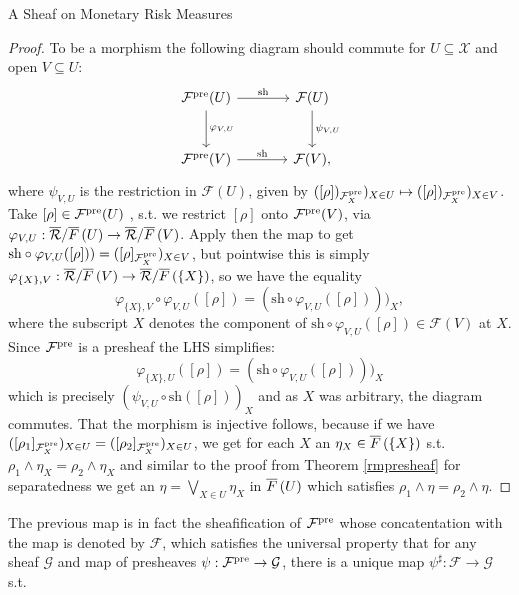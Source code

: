 \begin{subsection}{A Sheaf on Monetary Risk Measures}
\begin{proof}
        To be a morphism the following diagram should commute for \( U \subseteq \mathcal{X} \) and open \( V \subseteq U \):
        \[
        \begin{tikzcd}[row sep=large, column sep=large]
            \presh(U) \arrow[r, "\text{sh}"] \arrow[d, "\varphi_{V,U}"]& \mathcal{F}(U) \arrow[d, "\psi_{V,U}"] \\
            \presh(V) \arrow[r, "\text{sh}"] & \mathcal{F}(V),
        \end{tikzcd}
        \]
        where \( \psi_{V,U} \) is the restriction in \( \mathcal{F}(U) \), given by \( ([\rho])_{\mathcal{F}^{\text{pre}}_X})_{X \in U} \mapsto ([\rho])_{\mathcal{F}^{\text{pre}}_X})_{X \in V} \).
        Take \( [\rho] \in \mathcal{F}^{\text{pre}}(U) \) , s.t. we restrict
        \( [\rho] \) onto \( \mathcal{F}^{\text{pre}}(V) \), via \( \varphi_{V,U} : \overline{\mathcal{R}} / \overline{F}\left (U \right) \to \overline{\mathcal{R}} / \overline{F}\left (V \right) \).
        Apply then the map to get \( \text{sh} \circ \varphi_{V,U}([\rho])) = ([\rho]_{\mathcal{F}^{\text{pre}}_X})_{X \in V} \),
        but pointwise this is simply \( \varphi_{\{X\},V} : \overline{\mathcal{R}} / \overline{F}\left (V \right) \to \overline{\mathcal{R}} / \overline{F}\left (\{ X \}  \right) \),
        so we have the equality 
        \[
            \varphi_{\{X\},V} \circ \varphi_{V,U}([\rho]) = (\text{sh} \circ \varphi_{V,U}([\rho])))_X,
        \]
        where the subscript \( X \) denotes the component of \( \text{sh} \circ \varphi_{V,U}([\rho]) \in \mathcal{F}(V) \) at \( X \).
        Since \( \mathcal{F}^{\text{pre}} \) is a presheaf the LHS simplifies:
        \[
         \varphi_{\{X\}, U}([\rho]) = (\text{sh} \circ \varphi_{V,U}([\rho])))_X
        \]
        which is precisely \( (\psi_{V,U} \circ \text{sh}([\rho]))_X \) and as \( X \) was arbitrary, the diagram commutes.
        That the morphism is injective follows, because if
        we have \( ([\rho_1]_{\mathcal{F}^{\text{pre}}_X})_{X \in U} = ([\rho_2]_{\mathcal{F}^{\text{pre}}_X})_{X \in U} \), we get for each \( X \) an \( \eta_X \in \overline{F}\left (\{X\} \right) \)
        s.t. \( \rho_1 \wedge \eta_X = \rho_2 \wedge \eta_X \) and similar to the proof from Theorem \ref{rmpresheaf} for separatedness we get 
        an \( \eta = \bigvee_{X \in U} \eta_X \) in \( \overline{F}\left (U \right) \) which satisfies \( \rho_1 \wedge \eta = \rho_2 \wedge \eta \).
    \end{proof}
    The previous map is in fact the sheafification of \( \mathcal{F}^{\text{pre}} \) whose concatentation with the map is denoted by \( \mathcal{F} \), which satisfies the universal property that for any sheaf \( \mathcal{G} \) and map of presheaves \( \psi : \mathcal{F}^{\text{pre}} \to \mathcal{G} \), there is a unique map \( \psi^\sharp : \mathcal{F} \to \mathcal{G} \) s.t. 

\end{subsection}
